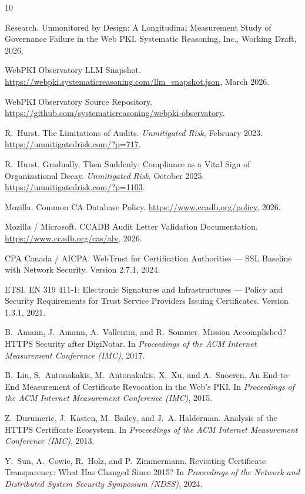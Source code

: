 \documentclass[10pt,twocolumn,letterpaper]{article}
\begin{document}

\begin{thebibliography}{10}

Research.
\newblock Unmonitored by Design: A Longitudinal Measurement Study of
  Governance Failure in the Web PKI.
\newblock Systematic Reasoning, Inc., Working Draft, 2026.

WebPKI Observatory LLM Snapshot.
\newblock \url{https://webpki.systematicreasoning.com/llm_snapshot.json},
  March 2026.

WebPKI Observatory Source Repository.
\newblock \url{https://github.com/systematicreasoning/webpki-observatory}.

R.~Hurst.
\newblock The Limitations of Audits.
\newblock \textit{Unmitigated Risk}, February 2023.
\newblock \url{https://unmitigatedrisk.com/?p=717}.

R.~Hurst.
\newblock Gradually, Then Suddenly: Compliance as a Vital Sign of
  Organizational Decay.
\newblock \textit{Unmitigated Risk}, October 2025.
\newblock \url{https://unmitigatedrisk.com/?p=1103}.

Mozilla.
\newblock Common CA Database Policy.
\newblock \url{https://www.ccadb.org/policy}, 2026.

Mozilla / Microsoft.
\newblock CCADB Audit Letter Validation Documentation.
\newblock \url{https://www.ccadb.org/cas/alv}, 2026.

CPA Canada / AICPA.
\newblock WebTrust for Certification Authorities --- SSL Baseline with Network
  Security.
\newblock Version 2.7.1, 2024.

ETSI.
\newblock EN 319 411-1: Electronic Signatures and Infrastructures --- Policy
  and Security Requirements for Trust Service Providers Issuing Certificates.
\newblock Version 1.3.1, 2021.

B.~Amann, J.~Amann, A.~Vallentin, and R.~Sommer.
\newblock Mission Accomplished? HTTPS Security after DigiNotar.
\newblock In \textit{Proceedings of the ACM Internet Measurement Conference
  (IMC)}, 2017.

B.~Liu, S.~Antonakakis, M.~Antonakakis, X.~Xu, and A.~Snoeren.
\newblock An End-to-End Measurement of Certificate Revocation in the Web's PKI.
\newblock In \textit{Proceedings of the ACM Internet Measurement Conference
  (IMC)}, 2015.

Z.~Durumeric, J.~Kasten, M.~Bailey, and J.~A. Halderman.
\newblock Analysis of the HTTPS Certificate Ecosystem.
\newblock In \textit{Proceedings of the ACM Internet Measurement Conference
  (IMC)}, 2013.

Y.~Sun, A.~Cowie, R.~Holz, and P.~Zimmermann.
\newblock Revisiting Certificate Transparency: What Has Changed Since 2015?
\newblock In \textit{Proceedings of the Network and Distributed System
  Security Symposium (NDSS)}, 2024.

\end{thebibliography}
\end{document}

